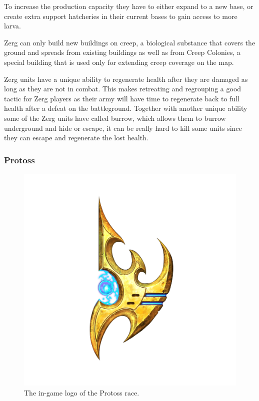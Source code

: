 To increase the production capacity they have to either expand to a new base, or create extra support hatcheries in their current bases to gain access to more larva.

Zerg can only build new buildings on creep, a biological substance that covers the ground and spreads from existing buildings as well as from Creep Colonies, a special building that is used only for extending creep coverage on the map.

Zerg units have a unique ability to regenerate health after they are damaged as long as they are not in combat. This makes retreating and regrouping a good tactic for Zerg players as their army will have time to regenerate back to full health after a defeat on the battleground. Together with another unique ability some of the Zerg units have called burrow, which allows them to burrow underground and hide or escape, it can be really hard to kill some units since they can escape and regenerate the lost health. 

\subsubsection{Protoss}
\begin{figure}[h!tb]
\centering
\includegraphics[scale=0.25]{graphics/protossicon.png}
\caption{The in-game logo of the Protoss race.\cite{protosslogo}}
\end{figure}

